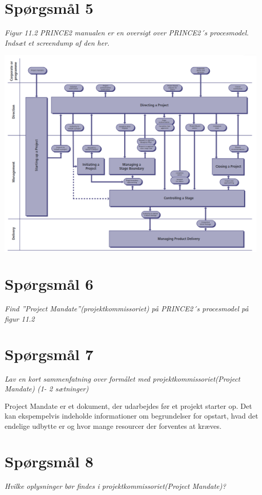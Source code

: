 \section{Spørgsmål 5}
\textit{Figur 11.2 PRINCE2 manualen er en oversigt over PRINCE2´s procesmodel. Indsæt et screendump af den her.}

\begin{center}
    \includegraphics[width=13cm]{prince2.includes/figure112.png}
\end{center}

\section{Spørgsmål 6}
\textit{Find ”Project Mandate”(projektkommissoriet) på PRINCE2´s procesmodel på figur 11.2}

\section{Spørgsmål 7}
\textit{Lav en kort sammenfatning over formålet med projektkommissoriet(Project Mandate) (1- 2 sætninger)}

Project Mandate er et dokument, der udarbejdes før et projekt starter op. Det kan ekspempelvis indeholde informationer om begrundelser for opstart, hvad det endelige udbytte er og hvor mange resourcer der forventes at kræves.

\section{Spørgsmål 8}
\textit{Hvilke oplysninger bør findes i projektkommissoriet(Project Mandate)?}

